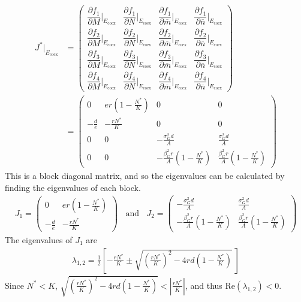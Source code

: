 \documentclass{amsart}
\theoremstyle{definition}
\theoremstyle{remark}
\numberwithin{equation}{section}
\begin{document}
\begin{align*}
	J^*|_{E_{\text{coex}}} &= \left(\begin{array}{cccc}
		\dfrac{\partial f_1}{\partial M}\Big|_{E_{\text{coex}}} & \dfrac{\partial f_1}{\partial N}\Big|_{E_{\text{coex}}} & \dfrac{\partial f_1}{\partial \overline{m}}\Big|_{E_{\text{coex}}} & \dfrac{\partial f_1}{\partial \overline{n}}\Big|_{E_{\text{coex}}} \\[10px]
		\dfrac{\partial f_2}{\partial M}\Big|_{E_{\text{coex}}} & \dfrac{\partial f_2}{\partial N}\Big|_{E_{\text{coex}}} & \dfrac{\partial f_2}{\partial \overline{m}}\Big|_{E_{\text{coex}}} & \dfrac{\partial f_2}{\partial \overline{n}}\Big|_{E_{\text{coex}}} \\[10px]
		\dfrac{\partial f_3}{\partial M}\Big|_{E_{\text{coex}}} & \dfrac{\partial f_3}{\partial N}\Big|_{E_{\text{coex}}} & \dfrac{\partial f_3}{\partial \overline{m}}\Big|_{E_{\text{coex}}} & \dfrac{\partial f_3}{\partial \overline{n}}\Big|_{E_{\text{coex}}} \\[10px]
		\dfrac{\partial f_4}{\partial M}\Big|_{E_{\text{coex}}} & \dfrac{\partial f_4}{\partial N}\Big|_{E_{\text{coex}}} & \dfrac{\partial f_4}{\partial \overline{m}}\Big|_{E_{\text{coex}}} & \dfrac{\partial f_4}{\partial \overline{n}}\Big|_{E_{\text{coex}}}
	\end{array}\right) \\
	&= \left(\begin{array}{cccc}
		0 & er\left(1 - \frac{N^*}{K}\right) & 0 & 0 \\
		-\frac{d}{e} & -\frac{rN^*}{K} & 0 & 0 \\
		0 & 0 & -\frac{\sigma_G^2d}{A} & \frac{\sigma_G^2d}{A} \\
		0 & 0 & -\frac{\beta_G^2r}{A}\left(1 - \frac{N^*}{K}\right) & \frac{\beta_G^2r}{A}\left(1 - \frac{N^*}{K}\right)
	\end{array}\right)
\end{align*}
This is a block diagonal matrix, and so the eigenvalues can be calculated by finding the eigenvalues of each block.
\begin{align*}
	J_1 = \left(\begin{array}{cc}
		0 & er\left(1 - \frac{N^*}{K}\right)\\
		-\frac{d}{e} & -\frac{rN^*}{K}
	\end{array}\right)\ \ \ \ \text{and}\ \ \ \ J_2 = \left(\begin{array}{cc}
		-\frac{\sigma_G^2d}{A} & \frac{\sigma_G^2d}{A} \\
        -\frac{\beta_G^2r}{A}\left(1 - \frac{N^*}{K}\right) & \frac{\beta_G^2r}{A}\left(1 - \frac{N^*}{K}\right)
	\end{array}\right)
\end{align*}
The eigenvalues of $J_1$ are
\begin{align*}
	\lambda_{1,2} = \frac{1}{2}\left[-\frac{rN^*}{K} \pm \sqrt{\left(\frac{rN^*}{K}\right)^2 - 4rd\left(1 - \frac{N^*}{K}\right)}\ \right]
\end{align*}
Since $N^* < K$, $\sqrt{\left(\frac{rN^*}{K}\right)^2 - 4rd\left(1 - \frac{N^*}{K}\right)} < \left|\frac{rN^*}{K}\right|$, and thus $\text{Re}(\lambda_{1,2}) < 0$. \\
\end{document}
